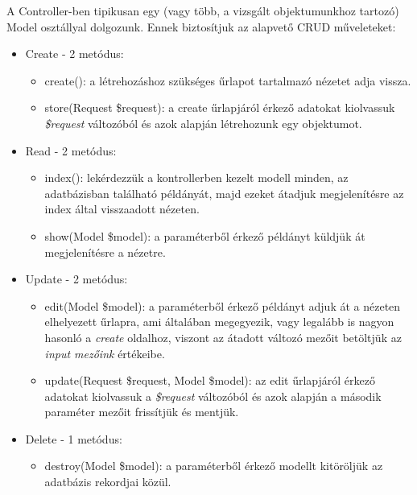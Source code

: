 \documentclass[
]{thesis-ekf}
\theoremstyle{definition}
\theoremstyle{remark}
\begin{document}
                    A Controller-ben tipikusan egy (vagy több, a vizsgált objektumunkhoz tartozó) Model osztállyal dolgozunk. Ennek biztosítjuk az alapvető CRUD műveleteket:
                    \begin{itemize}
                        \item Create - 2 metódus:
                            \begin{itemize}
                                \item create(): a létrehozáshoz szükséges űrlapot tartalmazó nézetet adja vissza.
                                \item store(Request \$request): a create űrlapjáról érkező adatokat kiolvassuk \emph{\$request} változóból és azok alapján létrehozunk egy objektumot.
                            \end{itemize}
                        \item Read - 2 metódus:
                            \begin{itemize}
                                \item index(): lekérdezzük a kontrollerben kezelt modell minden, az adatbázisban található példányát, majd ezeket átadjuk megjelenítésre az index által visszaadott nézeten.
                                \item show(Model \$model): a paraméterből érkező példányt küldjük át megjelenítésre a nézetre.
                            \end{itemize}
                        \item Update - 2 metódus:
                             \begin{itemize}
                                \item edit(Model \$model):  a paraméterből érkező példányt adjuk át a nézeten elhelyezett űrlapra, ami általában megegyezik, vagy legalább is nagyon hasonló a \emph{create} oldalhoz, viszont az átadott változó mezőit betöltjük az \emph{input mezőink} értékeibe.
                                \item update(Request \$request, Model \$model): az edit űrlapjáról érkező adatokat kiolvassuk a \emph{\$request} változóból és azok alapján a második paraméter mezőit frissítjük és mentjük.
                            \end{itemize}
                        \item Delete - 1 metódus:
                        \begin{itemize}
                         		\item destroy(Model \$model): a paraméterből érkező modellt kitöröljük az adatbázis rekordjai közül.
                        \end{itemize}
                    \end{itemize}
\end{document}
